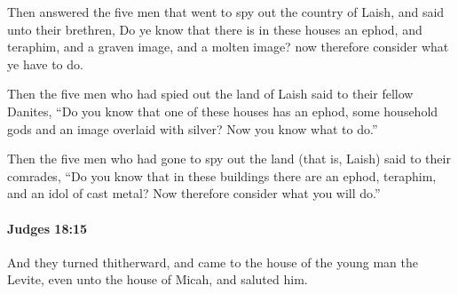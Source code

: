 			\begin{versebox}
					\item[BHS] 
					\item[ASV] Then answered the five men that went to spy out the country of Laish, and said unto their brethren, Do ye know that there is in these houses an ephod, and teraphim, and a graven image, and a molten image? now therefore consider what ye have to do.
					\item[NIV] Then the five men who had spied out the land of Laish said to their fellow Danites, “Do you know that one of these houses has an ephod, some household gods and an image overlaid with silver? Now you know what to do.”
					\item[NRSV] Then the five men who had gone to spy out the land (that is, Laish) said to their comrades, “Do you know that in these buildings there are an ephod, teraphim, and an idol of cast metal? Now therefore consider what you will do.”
			\end{versebox}

		\paragraph{Judges 18:15} %
			\label{JUDGES-18-15}

			And they turned thitherward, and came to the house of the young man the Levite, even unto the house of Micah, and saluted him.

